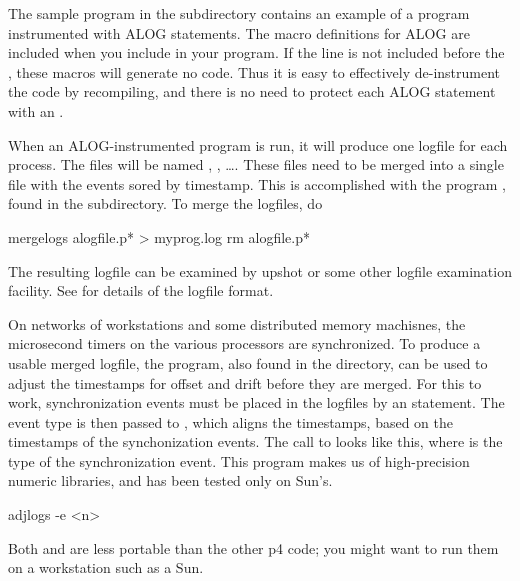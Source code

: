 The sample program  in the  subdirectory
contains an example of a program instrumented with ALOG statements.  The macro
definitions for ALOG are included when you include  in
your program.  If the line  is not included before
the , these macros will generate no code.  Thus it is
easy to effectively de-instrument the code by recompiling, and there is no
need to protect each ALOG statement with an .
 
When an ALOG-instrumented program is run, it will produce one logfile for each
process.  The files will be named , ,
\ldots.  These files need to be merged into a single file with the events
sored by timestamp.  This is accomplished with the program ,
found in the  subdirectory.  To merge the logfiles, do 

\begin{example}
mergelogs alogfile.p* > myprog.log
rm alogfile.p*
\end{example}

The resulting logfile can be examined by upshot or some other logfile
examination facility.  See \cite{herrarte-lusk:upshot} for details of the
logfile format.

On networks of workstations and some distributed memory machisnes, the
microsecond timers on the various processors are synchronized.  To produce a
usable merged logfile, the  program, also found in the
 directory, can be used to adjust the timestamps for offset and
drift before they are merged.  For this to work, synchronization events must
be placed in the logfiles by an  statement.  The event type
is then passed to , which aligns the timestamps, based on the
timestamps of the synchonization events.  The call to  looks
like this, where  is the type of the synchronization event.  This
program makes us of high-precision numeric libraries, and has been tested only
on Sun's.

\begin{example}
adjlogs -e <n>
\end{example}

Both  and  are less portable than the other p4
code;  you might want to run them on a workstation such as a Sun.




